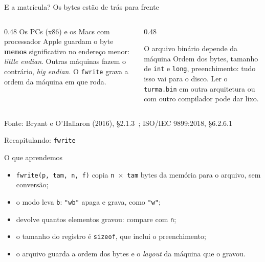 \documentclass[aspectratio=169]{beamer}
\newcommand{\fonte}[1]{\vfill\hfill{\scriptsize\textcolor{UFSGray}{Fonte: #1}}}
\begin{document}
\begin{frame}{E a matrícula? Os bytes estão de trás para frente}
  \begin{center}
  \end{center}
  \vspace{-0.3em}
  \begin{columns}[T]
    \begin{column}{0.48\textwidth}
      \small Os PCs (x86) e os Macs com processador Apple guardam o byte
      \textbf{menos} significativo no endereço menor: \emph{little endian}.
      Outras máquinas fazem o contrário, \emph{big endian}. O
      \texttt{fwrite} grava a ordem da máquina em que roda.
    \end{column}
    \begin{column}{0.48\textwidth}
      \begin{alertblock}{O arquivo binário depende da máquina}
        \small Ordem dos bytes, tamanho de \texttt{int} e \texttt{long},
        preenchimento: tudo isso vai para o disco. Ler o \texttt{turma.bin}
        em outra arquitetura ou com outro compilador pode dar lixo.
      \end{alertblock}
    \end{column}
  \end{columns}
  \fonte{Bryant e O'Hallaron (2016), §2.1.3~\cite{bryant2016computer};
    ISO/IEC 9899:2018, §6.2.6.1~\cite{iso2018c17}}
\end{frame}

\begin{frame}{Recapitulando: \texttt{fwrite}}
  \begin{block}{O que aprendemos}
    \begin{itemize}
      \item \texttt{fwrite(p, tam, n, f)} copia \texttt{n $\times$ tam}
        bytes da memória para o arquivo, sem conversão;
      \item o modo leva \texttt{b}: \texttt{"wb"} apaga e grava, como
        \texttt{"w"};
      \item devolve quantos elementos gravou: compare com \texttt{n};
      \item o tamanho do registro é \texttt{sizeof}, que inclui o
        preenchimento;
      \item o arquivo guarda a ordem dos bytes e o \emph{layout} da máquina
        que o gravou.
    \end{itemize}
  \end{block}
\end{frame}
\end{document}
